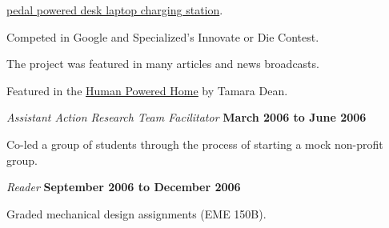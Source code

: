 \documentclass[10pt]{article}
\newenvironment{outerlist}[1][\enskip\textbullet]%
        {\begin{itemize}[#1]}{\end{itemize}%
         \vspace{-.6\baselineskip}}
\newenvironment{innerlist}[1][\enskip\textbullet]%
        {\begin{compactitem}[#1]}{\end{compactitem}}
\newcommand{\blankline}{\quad\pagebreak[2]}
\begin{document}
\begin{outerlist}
\begin{innerlist}
        \href{http://mae.ucdavis.edu/~biosport/jkm/ped_desk.htm}{pedal powered
        desk laptop charging station}.
    \item Competed in Google and Specialized's Innovate or Die Contest.
    \item The project was featured in many articles and news broadcasts.
    \item Featured in the
        \href{http://www.thehumanpoweredhome.com/}{\underline{Human Powered
        Home}} by Tamara Dean.
  \end{innerlist}
  \item[] \textit{Assistant Action Research Team Facilitator}%
    \hfill \textbf{March 2006 to June 2006}
  \begin{innerlist}
    \item Co-led a group of students through the process of starting a mock
        non-profit group.
  \end{innerlist}
  \item[] \textit{Reader}%
    \hfill \textbf{September 2006 to December 2006}
  \begin{innerlist}
    \item Graded mechanical design assignments (EME 150B).
  \end{innerlist}
\end{outerlist}

\blankline
\end{document}
